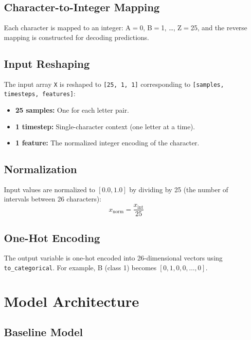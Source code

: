 \documentclass[12pt,a4paper]{article}
\begin{document}
\subsection{Character-to-Integer Mapping}

Each character is mapped to an integer: A$=$0, B$=$1, \ldots, Z$=$25, and the reverse
mapping is constructed for decoding predictions.

\subsection{Input Reshaping}

The input array \texttt{X} is reshaped to \texttt{[25, 1, 1]} corresponding to
\texttt{[samples, timesteps, features]}:
\begin{itemize}
  \item \textbf{25 samples:} One for each letter pair.
  \item \textbf{1 timestep:} Single-character context (one letter at a time).
  \item \textbf{1 feature:} The normalized integer encoding of the character.
\end{itemize}

\subsection{Normalization}

Input values are normalized to $[0.0, 1.0]$ by dividing by 25 (the number of
intervals between 26 characters):
\[
  x_{\text{norm}} = \frac{x_{\text{int}}}{25}
\]

\subsection{One-Hot Encoding}

The output variable is one-hot encoded into 26-dimensional vectors using
\texttt{to\_categorical}. For example, B (class 1) becomes
$[0, 1, 0, 0, \ldots, 0]$.

\section{Model Architecture}

\subsection{Baseline Model}
\end{document}
